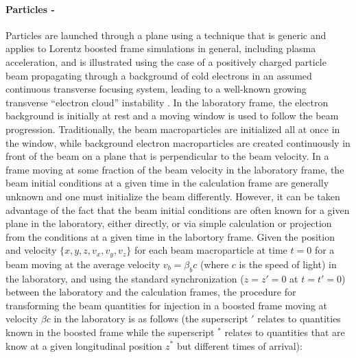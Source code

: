\documentclass[]{report}
\begin{document}
\paragraph{Particles - }
Particles are launched through a plane using a technique that is generic and applies to Lorentz boosted frame simulations in general, including plasma acceleration, and is illustrated using the case of a positively charged particle beam propagating through a background of cold electrons in an assumed continuous transverse focusing system, leading to a well-known growing transverse ``electron cloud'' instability  \cite{Vayprl07}. In the laboratory frame, the electron background is initially at rest and a moving window is used to follow the beam progression. Traditionally, the beam macroparticles are initialized all at once in the window, while background electron macroparticles are created continuously in front of the beam on a plane that is perpendicular to the beam velocity. In a frame moving at some fraction of the beam velocity in the laboratory frame, the beam initial conditions at a given time in the calculation frame are generally unknown and one must initialize the beam differently. However, it can be taken advantage of the fact that the beam initial conditions are often known for a given plane in the laboratory, either directly, or via simple calculation or projection from the conditions at a given time in the labortory frame. Given the position and velocity $\{x,y,z,v_x,v_y,v_z\}$ for each beam macroparticle at time $t=0$ for a beam moving at the average velocity $v_b=\beta_b c$ (where $c$ is the speed of light) in the laboratory, and using the standard synchronization ($z=z'=0$ at $t=t'=0$) between the laboratory and the calculation frames, the procedure for transforming the beam quantities for injection in a boosted frame moving at velocity $\beta c$ in the laboratory is as follows (the superscript $'$ relates to quantities known in the boosted frame while the superscript $^*$ relates to quantities that are know at a given longitudinal position $z^*$ but different times of arrival):
\end{document}
